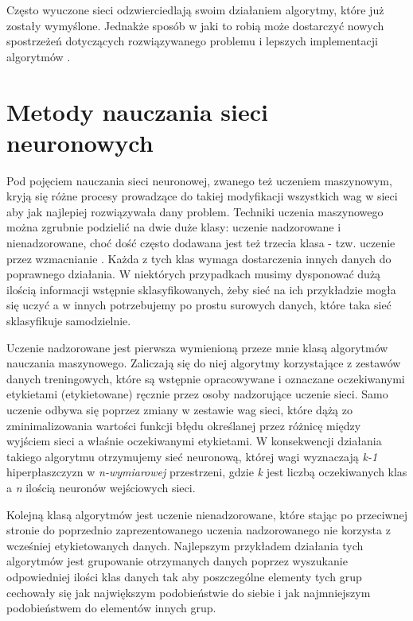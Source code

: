\documentclass[12pt, oneside, a4paper]{report}
\begin{document}
Często wyuczone sieci odzwierciedlają swoim działaniem algorytmy, które już zostały wymyślone. Jednakże sposób w jaki to robią może dostarczyć nowych spostrzeżeń dotyczących rozwiązywanego problemu i lepszych implementacji algorytmów \citep{murray1995applications}.


\section{Metody nauczania sieci neuronowych}

Pod pojęciem nauczania sieci neuronowej, zwanego też uczeniem maszynowym, kryją się różne procesy prowadzące do takiej modyfikacji wszystkich wag w sieci aby jak najlepiej rozwiązywała dany problem. Techniki uczenia maszynowego można zgrubnie podzielić na dwie duże klasy: uczenie nadzorowane i nienadzorowane, choć dość często dodawana jest też trzecia klasa - tzw. uczenie przez wzmacnianie \citep{roelants2017deeplearning}. Każda z tych klas wymaga dostarczenia innych danych do poprawnego działania. W niektórych przypadkach musimy dysponować dużą ilością informacji wstępnie sklasyfikowanych, żeby sieć na ich przykładzie mogła się uczyć a w innych potrzebujemy po prostu surowych danych, które taka sieć sklasyfikuje samodzielnie.

Uczenie nadzorowane jest pierwsza wymienioną przeze mnie klasą algorytmów nauczania maszynowego. Zaliczają się do niej algorytmy korzystające z zestawów danych treningowych, które są wstępnie opracowywane i oznaczane oczekiwanymi etykietami (etykietowane) ręcznie przez osoby nadzorujące uczenie sieci. Samo uczenie odbywa się poprzez zmiany w zestawie wag sieci, które dążą zo zminimalizowania wartości funkcji błędu określanej przez różnicę między wyjściem sieci a właśnie oczekiwanymi etykietami. W konsekwencji działania takiego algorytmu otrzymujemy sieć neuronową, której wagi wyznaczają \textit{k-1} hiperpłaszczyzn w \textit{n-wymiarowej} przestrzeni, gdzie \textit{k} jest liczbą oczekiwanych klas a \textit{n} ilością neuronów wejściowych sieci.

Kolejną klasą algorytmów jest uczenie nienadzorowane, które stając po przeciwnej stronie do poprzednio zaprezentowanego uczenia nadzorowanego nie korzysta z wcześniej etykietowanych danych. Najlepszym przykładem działania tych algorytmów jest grupowanie otrzymanych danych poprzez wyszukanie odpowiedniej ilości klas danych tak aby poszczególne elementy tych grup cechowały się jak największym podobieństwie do siebie i jak najmniejszym podobieństwem do elementów innych grup.
\end{document}
